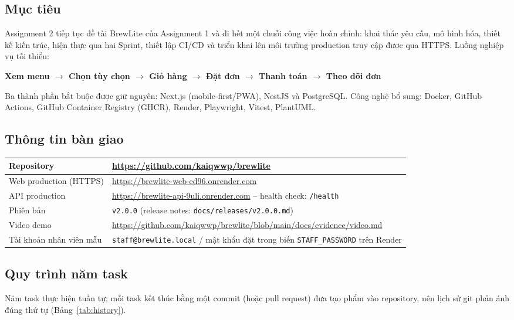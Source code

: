 \documentclass[a4paper]{article}
\newcommand{\st}[1]{\texttt{#1}}
\newcommand{\ra}{\ensuremath{\rightarrow}}
\begin{document}
\subsection{Mục tiêu}
Assignment 2 tiếp tục đề tài BrewLite của Assignment 1 và đi hết một chuỗi công việc hoàn chỉnh: khai thác yêu cầu, mô hình hóa, thiết kế kiến trúc, hiện thực qua hai Sprint, thiết lập CI/CD và triển khai lên môi trường production truy cập được qua HTTPS. Luồng nghiệp vụ tối thiểu:
\begin{center}
\textbf{Xem menu \ra{} Chọn tùy chọn \ra{} Giỏ hàng \ra{} Đặt đơn \ra{} Thanh toán \ra{} Theo dõi đơn}
\end{center}
Ba thành phần bắt buộc được giữ nguyên: Next.js (mobile-first/PWA), NestJS và PostgreSQL. Công nghệ bổ sung: Docker, GitHub Actions, GitHub Container Registry (GHCR), Render, Playwright, Vitest, PlantUML.

\subsection{Thông tin bàn giao}
\begin{center}
\begin{tabular}{|L{4.2cm}|L{10.8cm}|}
\hline
Repository & \url{https://github.com/kaiqwwp/brewlite} \\ \hline
Web production (HTTPS) & \url{https://brewlite-web-ed96.onrender.com} \\ \hline
API production & \url{https://brewlite-api-9uli.onrender.com} -- health check: \st{/health} \\ \hline
Phiên bản & \st{v2.0.0} (release notes: \st{docs/releases/v2.0.0.md}) \\ \hline
Video demo & \url{https://github.com/kaiqwwp/brewlite/blob/main/docs/evidence/video.md} \\ \hline
Tài khoản nhân viên mẫu & \st{staff@brewlite.local} / mật khẩu đặt trong biến \st{STAFF\_PASSWORD} trên Render \\ \hline
\end{tabular}
\end{center}

\subsection{Quy trình năm task}
Năm task thực hiện tuần tự; mỗi task kết thúc bằng một commit (hoặc pull request) đưa tạo phẩm vào repository, nên lịch sử git phản ánh đúng thứ tự (Bảng~\ref{tab:history}).
\end{document}
